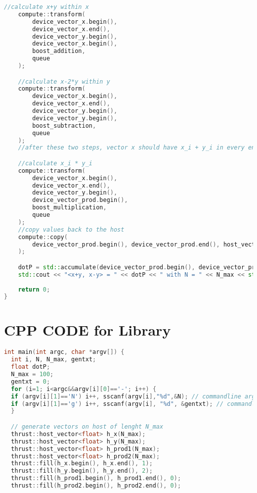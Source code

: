 \begin{appendix}
\begin{lstlisting}[language=C++, title=CPP CODE for \fun{Boost.Compute} Library]
    //calculate x+y within x
    compute::transform(
        device_vector_x.begin(),
        device_vector_x.end(),
        device_vector_y.begin(),
        device_vector_x.begin(),
        boost_addition,
        queue
    );

    //calculate x-2*y within y
    compute::transform(
        device_vector_x.begin(),
        device_vector_x.end(),
        device_vector_y.begin(),
        device_vector_y.begin(),
        boost_subtraction,
        queue
    );
    //after these two steps, vector x should have x_i + y_i in every entry, and vector y should have x_i - y_i in every entry and one can calculated the product in the thrid vector.

    //calculate x_i * y_i
    compute::transform(
        device_vector_x.begin(),
        device_vector_x.end(),
        device_vector_y.begin(),
        device_vector_prod.begin(),
        boost_multiplication,
        queue
    );
    //copy values back to the host
    compute::copy(
        device_vector_prod.begin(), device_vector_prod.end(), host_vector_prod.begin(), queue
    );

    dotP = std::accumulate(device_vector_prod.begin(), device_vector_prod.end(), 0);
    std::cout << "<x+y, x-y> = " << dotP << " with N = " << N_max << std::endl;
    
    return 0;
}
\end{lstlisting}
\pagebreak

\section{CPP CODE for  Library}
\label{app_1b}
\begin{lstlisting}[language=C++, title=CPP CODE for \fun{Thrust} Library]
int main(int argc, char *argv[]) {
  int i, N, N_max, gentxt;
  float dotP;
  N_max = 100;
  gentxt = 0;
  for (i=1; i<argc&&argv[i][0]=='-'; i++) {
  if (argv[i][1]=='N') i++, sscanf(argv[i],"%d",&N); // commandline arg -N for adjusting max. count, if none given N=100
  if (argv[i][1]=='g') i++, sscanf(argv[i], "%d", &gentxt); // commandline arg. -g for generating a txt, if none given, no .txt NOT IMPLEMENTED
  }

  // generate vectors on host of lenght N_max
  thrust::host_vector<float> h_x(N_max);
  thrust::host_vector<float> h_y(N_max);
  thrust::host_vector<float> h_prod1(N_max);
  thrust::host_vector<float> h_prod2(N_max);
  thrust::fill(h_x.begin(), h_x.end(), 1);
  thrust::fill(h_y.begin(), h_y.end(), 2);
  thrust::fill(h_prod1.begin(), h_prod1.end(), 0);
  thrust::fill(h_prod2.begin(), h_prod2.end(), 0);


\end{lstlisting}
\end{appendix}
